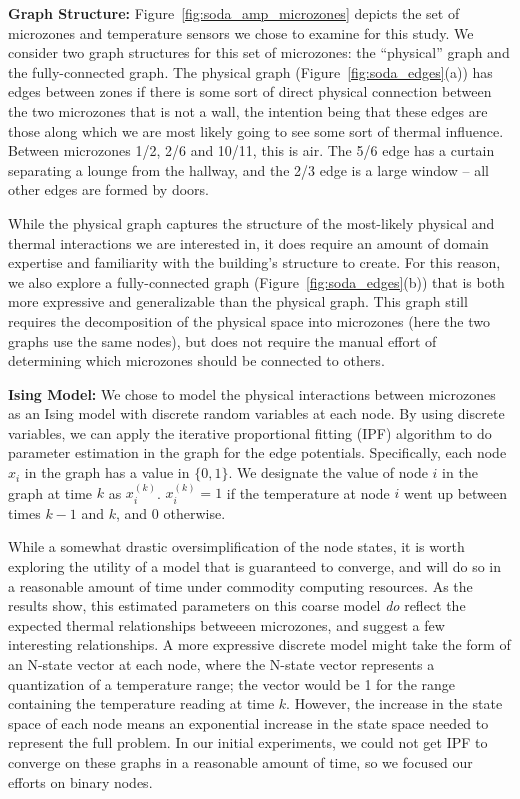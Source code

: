 \textbf{Graph Structure:} Figure~\ref{fig:soda_amp_microzones} depicts the set of microzones and temperature sensors we chose to examine for this study.
We consider two graph structures for this set of microzones: the ``physical'' graph and the fully-connected graph.
The physical graph (Figure~\ref{fig:soda_edges}(a)) has edges between zones if there is some sort of direct physical connection between the two microzones that is not a wall, the intention being that these edges are those along which we are most likely going to see some sort of thermal influence.
Between microzones 1/2, 2/6 and 10/11, this is air.
The 5/6 edge has a curtain separating a lounge from the hallway, and the 2/3 edge is a large window -- all other edges are formed by doors.

While the physical graph captures the structure of the most-likely physical and thermal interactions we are interested in, it does require an amount of domain expertise and familiarity with the building's structure to create.
For this reason, we also explore a fully-connected graph (Figure~\ref{fig:soda_edges}(b)) that is both more expressive and generalizable than the physical graph.
This graph still requires the decomposition of the physical space into microzones (here the two graphs use the same nodes), but does not require the manual effort of determining which microzones should be connected to others.

\textbf{Ising Model:} We chose to model the physical interactions between microzones as an Ising model with discrete random variables at each node.
By using discrete variables, we can apply the iterative proportional fitting (IPF) algorithm to do parameter estimation in the graph for the edge potentials.
Specifically, each node $x_i$ in the graph has a value in $\lbrace 0, 1\rbrace$.
We designate the value of node $i$ in the graph at time $k$ as $x_i^{(k)}$.
$x_i^{(k)} = 1$ if the temperature at node $i$ went up between times $k-1$  and $k$, and 0 otherwise.

While a somewhat drastic oversimplification of the node states, it is worth exploring the utility of a model that is guaranteed to converge, and will do so in a reasonable amount of time under commodity computing resources.
As the results show, this estimated parameters on this coarse model \emph{do} reflect the expected thermal relationships betweeen microzones, and suggest a few interesting relationships.
A more expressive discrete model might take the form of an N-state vector at each node, where the N-state vector represents a quantization of a temperature range; the vector would be 1 for the range containing the temperature reading at time $k$.
However, the increase in the state space of each node means an exponential increase in the state space needed to represent the full problem.
In our initial experiments, we could not get IPF to converge on these graphs in a reasonable amount of time, so we focused our efforts on binary nodes.

